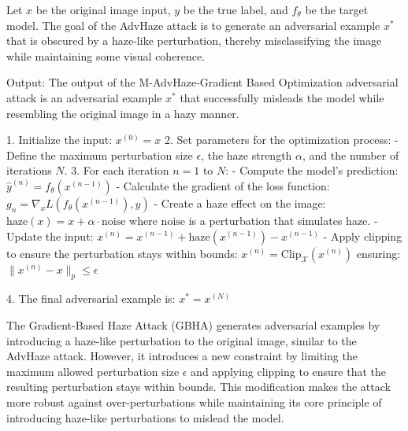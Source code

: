 Let \( x \) be the original image input, \( y \) be the true label, and \( f_{\theta} \) be the target model. The goal of the AdvHaze attack is to generate an adversarial example \( x^* \) that is obscured by a haze-like perturbation, thereby misclassifying the image while maintaining some visual coherence.

Output: The output of the M-AdvHaze-Gradient Based Optimization adversarial attack is an adversarial example $x^*$ that successfully misleads the model while resembling the original image in a hazy manner.

1. Initialize the input:
   $x^{(0)} = x$
2. Set parameters for the optimization process:
   - Define the maximum perturbation size $\epsilon$, the haze strength $\alpha$, and the number of iterations $N$.
3. For each iteration $n = 1$ to $N$:
   - Compute the model's prediction:
   $\hat{y}^{(n)} = f_{\theta}(x^{(n-1)})$
   - Calculate the gradient of the loss function:
   $g_n = \nabla_x L(f_{\theta}(x^{(n-1)}), y)$
   - Create a haze effect on the image:
   $\text{haze}(x) = x + \alpha \cdot \text{noise}$
   where $\text{noise}$ is a perturbation that simulates haze.
   - Update the input:
   $x^{(n)} = x^{(n-1)} + \text{haze}(x^{(n-1)}) - x^{(n-1)}$
   - Apply clipping to ensure the perturbation stays within bounds:
   $x^{(n)} = \text{Clip}_{\mathcal{X}}(x^{(n)})$
   ensuring:
   $\|x^{(n)} - x\|_p \leq \epsilon$

4. The final adversarial example is:
   $x^* = x^{(N)}$

The Gradient-Based Haze Attack (GBHA) generates adversarial examples by introducing a haze-like perturbation to the original image, similar to the AdvHaze attack. However, it introduces a new constraint by limiting the maximum allowed perturbation size $\epsilon$ and applying clipping to ensure that the resulting perturbation stays within bounds. This modification makes the attack more robust against over-perturbations while maintaining its core principle of introducing haze-like perturbations to mislead the model.